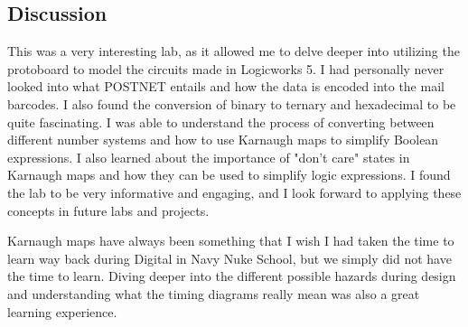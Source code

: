 \documentclass[12pt]{article}
\begin{document}
\subsection*{Discussion}
This was a very interesting lab, as it allowed me to delve deeper into utilizing the protoboard to model the circuits made in Logicworks 5. I had personally never looked into what POSTNET entails and how the data is encoded into the mail barcodes. I also found the conversion of binary to ternary and hexadecimal to be quite fascinating. I was able to understand the process of converting between different number systems and how to use Karnaugh maps to simplify Boolean expressions. I also learned about the importance of "don't care" states in Karnaugh maps and how they can be used to simplify logic expressions. I found the lab to be very informative and engaging, and I look forward to applying these concepts in future labs and projects.

Karnaugh maps have always been something that I wish I had taken the time to learn way back during Digital in Navy Nuke School, but we simply did not have the time to learn. Diving deeper into the different possible hazards during design and understanding what the timing diagrams really mean was also a great learning experience.
\end{document}
